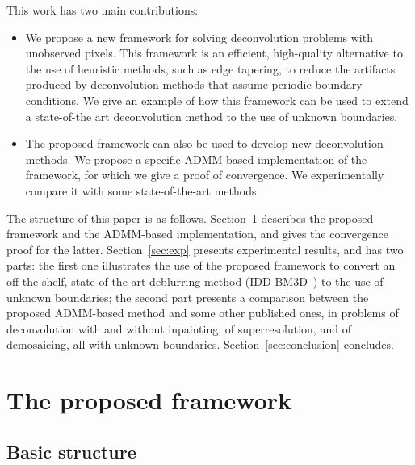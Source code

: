 \documentclass[10pt,twocolumn,twoside]{IEEEtran}
\begin{document}
This work has two main contributions:
\begin{itemize}
	\item We propose a new framework for solving deconvolution problems with unobserved pixels. This framework is an efficient, high-quality alternative to the use of heuristic methods, such as edge tapering, to reduce the artifacts produced by deconvolution methods that assume periodic boundary conditions.  We give an example of how this framework can be used to extend a state-of-the art deconvolution method to the use of unknown boundaries.
  
   \item The proposed framework can also be used to develop new deconvolution methods. We propose a specific ADMM-based implementation of the framework, for which we give a proof of convergence. We experimentally compare it with some state-of-the-art methods.
\end{itemize}

The structure of this paper is as follows. Section~\ref{sec:method} describes the proposed framework and the ADMM-based implementation, and gives the convergence proof for the latter. Section~\ref{sec:exp} presents experimental results, and has two parts: the first one illustrates the use of the proposed framework to convert an off-the-shelf, state-of-the-art deblurring method (IDD-BM3D~\cite{Danielyan2012}) to the use of unknown boundaries; the second part presents a comparison between the proposed ADMM-based method and some other published ones, in problems of deconvolution with and without inpainting, of superresolution, and of demosaicing, all with unknown boundaries. Section~\ref{sec:conclusion} concludes.


\section{The proposed framework} \label{sec:method}
\label{sec:framework}

\subsection{Basic structure}
\label{sec:basicstructure}
\end{document}
